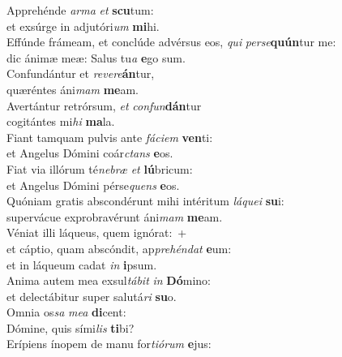 \evenverse Apprehénde \textit{ar}\textit{ma} \textit{et} \textbf{scu}tum:~\*\\
\evenverse et exsúrge in adjutóri\textit{um} \textbf{mi}hi.\\
\oddverse Effúnde frámeam, et conclúde advérsus eos, \textit{qui} \textit{per}\textit{se}\textbf{quún}tur me:~\*\\
\oddverse dic ánimæ meæ: Salus tu\textit{a} \textbf{e}go sum.\\
\evenverse Confundántur et \textit{re}\textit{ve}\textit{re}\textbf{án}tur,~\*\\
\evenverse quæréntes áni\textit{mam} \textbf{me}am.\\
\oddverse Avertántur retrórsum, \textit{et} \textit{con}\textit{fun}\textbf{dán}tur~\*\\
\oddverse cogitántes mi\textit{hi} \textbf{ma}la.\\
\evenverse Fiant tamquam pulvis ante \textit{fá}\textit{ci}\textit{em} \textbf{ven}ti:~\*\\
\evenverse et Angelus Dómini coár\textit{ctans} \textbf{e}os.\\
\oddverse Fiat via illórum té\textit{ne}\textit{bræ} \textit{et} \textbf{lú}bricum:~\*\\
\oddverse et Angelus Dómini pérse\textit{quens} \textbf{e}os.\\
\evenverse Quóniam gratis abscondérunt mihi intéritum \textit{lá}\textit{que}\textit{i} \textbf{su}i:~\*\\
\evenverse supervácue exprobravérunt áni\textit{mam} \textbf{me}am.\\
\oddverse Véniat illi láqueus, quem ignórat:~+\\
\oddverse  et cáptio, quam abscóndit, ap\textit{pre}\textit{hén}\textit{dat} \textbf{e}um:~\*\\
\oddverse et in láqueum cadat \textit{in} \textbf{i}psum.\\
\evenverse Anima autem mea exsul\textit{tá}\textit{bit} \textit{in} \textbf{Dó}mino:~\*\\
\evenverse et delectábitur super salutá\textit{ri} \textbf{su}o.\\
\oddverse Omnia os\textit{sa} \textit{me}\textit{a} \textbf{di}cent:~\*\\
\oddverse Dómine, quis sími\textit{lis} \textbf{ti}bi?\\
\evenverse Erípiens ínopem de manu for\textit{ti}\textit{ó}\textit{rum} \textbf{e}jus:~\*\\
